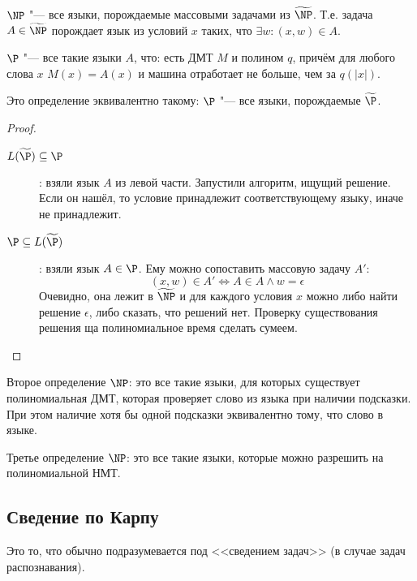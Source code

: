 	\begin{Def}
		$\NP$ "--- все языки, порождаемые массовыми задачами из $\widetilde{\NP}$.
		Т.е. задача $A \in \widetilde{\NP}$ порождает язык из условий $x$ таких, что $\exists w \colon (x, w) \in A$.
	\end{Def}
	\begin{Def}
		$\P$ "--- все такие языки $A$, что: есть ДМТ $M$ и полином $q$, причём для любого слова $x$ $M(x)=A(x)$ и машина отработает не больше, чем за $q(|x|)$.
	\end{Def}
	\begin{assertion}
		Это определение эквивалентно такому: $\P$ "--- все языки, порождаемые $\widetilde{\P}$.
	\end{assertion}
	\begin{proof}
		\begin{description}
			\item[$L(\widetilde{\P}) \subseteq \P$]:
				взяли язык $A$ из левой части.
				Запустили алгоритм, ищущий решение.
				Если он нашёл, то условие принадлежит соответствующему языку, иначе не принадлежит.
			\item[$\P \subseteq L(\widetilde{\P})$]:
				взяли язык $A \in \P$.
				Ему можно сопоставить массовую задачу $A'$:
				\[ (x, w) \in A' \iff A \in A \land w=\epsilon \]
				Очевидно, она лежит в $\widetilde{\NP}$ и для каждого условия $x$ можно либо найти решение $\epsilon$, либо сказать, что решений нет.
				Проверку существования решения ща полиномиальное время сделать сумеем.
		\end{description}
	\end{proof}

	\begin{assertion}
		Второе определение $\NP$: это все такие языки, для которых существует полиномиальная ДМТ, которая проверяет слово из языка при наличии подсказки.
		При этом наличие хотя бы одной подсказки эквивалентно тому, что слово в языке.
	\end{assertion}
	\begin{assertion}
		Третье определение $\NP$: это все такие языки, которые можно разрешить на полиномиальной НМТ.
	\end{assertion}

\subsection{Сведение по Карпу}
	Это то, что обычно подразумевается под <<сведением задач>> (в случае задач распознавания).

